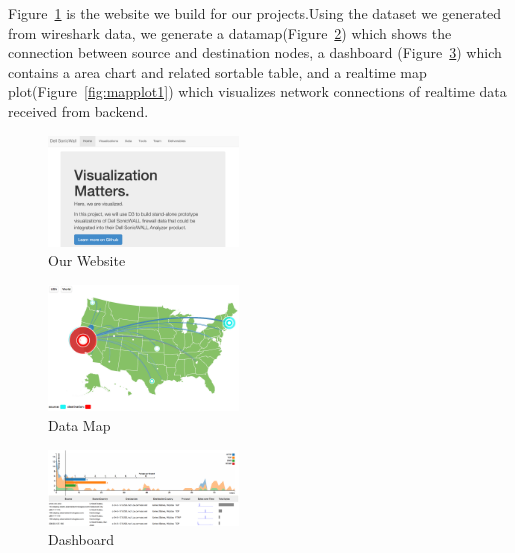 \documentclass[paper=a4, fontsize=11pt]{report} %
\begin{document}
\begin{description}[style=nextline]
    \item[\href{http://sjengle.cs.usfca.edu/cs690-sonicwall/deliverables.html}{Our Visualizations}]
    Figure~\ref{fig:website} is the website we build for our projects.Using the dataset we generated
from wireshark data, we generate a datamap(Figure~\ref{fig:datamap}) which shows the connection
between source and destination nodes, a dashboard (Figure~\ref{fig:dashboard1}) which contains a
area chart and related sortable table, and a  realtime map plot(Figure~\ref{fig:mapplot1}) which
visualizes network connections of realtime data received from backend.

    \begin{figure}[H]
        \begin{center}
            \includegraphics[width=0.45\textwidth]{website.png}
        \end{center}
        \caption{Our Website}\label{fig:website}
    \end{figure}

    \begin{figure}[H]
        \begin{center}
            \includegraphics[width=0.45\textwidth]{datamap.png}
        \end{center}
        \caption{Data Map}\label{fig:datamap}
    \end{figure}

    \begin{figure}[H]
        \begin{center}
            \includegraphics[width=0.45\textwidth]{dashboard.png}
        \end{center}
        \caption{Dashboard}\label{fig:dashboard1}
    \end{figure}


\end{description}
\end{document}
